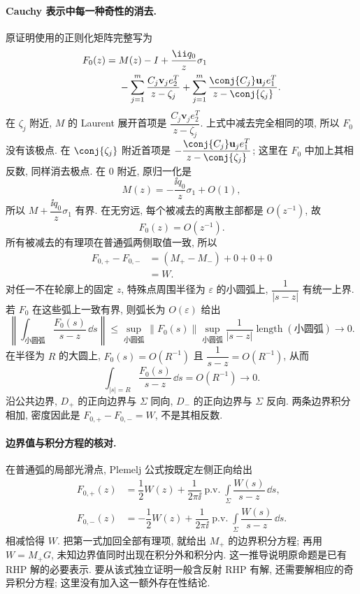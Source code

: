 \paragraph{Cauchy 表示中每一种奇性的消去.}
原证明使用的正则化矩阵完整写为
\[
\begin{aligned}
F_0(z)
={}&M(z)-I+\dfrac{\ii q_0}{z}\sigma_1\\
&-\sum\limits_{j=1}^{m}
\dfrac{C_j\mathbf v_je_2^T}{z-\zeta_j}
+\sum\limits_{j=1}^{m}
\dfrac{\conj{C_j}\mathbf u_je_1^T}{z-\conj{\zeta_j}}.
\end{aligned}
\]
在 $\zeta_j$ 附近, $M$ 的 Laurent 展开首项是
$\dfrac{C_j\mathbf v_je_2^T}{z-\zeta_j}$.
上式中减去完全相同的项, 所以 $F_0$ 没有该极点.
在 $\conj{\zeta_j}$ 附近首项是
$-\dfrac{\conj{C_j}\mathbf u_je_1^T}{z-\conj{\zeta_j}}$;
这里在 $F_0$ 中加上其相反数, 同样消去极点.
在 $0$ 附近, 原归一化是
\[
M(z)=-\dfrac{\ii q_0}{z}\sigma_1+O(1),
\]
所以 $M+\dfrac{\ii q_0}{z}\sigma_1$ 有界.
在无穷远, 每个被减去的离散主部都是 $O(z^{-1})$, 故
\[
F_0(z)=O(z^{-1}).
\]
所有被减去的有理项在普通弧两侧取值一致, 所以
\[
\begin{aligned}
F_{0,+}-F_{0,-}
&=(M_+-M_-)+0+0+0\\
&=W.
\end{aligned}
\]
对任一不在轮廓上的固定 $z$, 特殊点周围半径为 $\varepsilon$ 的小圆弧上,
$\dfrac{1}{|s-z|}$ 有统一上界.
若 $F_0$ 在这些弧上一致有界, 则弧长为 $O(\varepsilon)$ 给出
\[
\left\|
\int_{\text{小圆弧}}
\dfrac{F_0(s)}{s-z}\,\dd s
\right\|
\le
\sup\limits_{\text{小圆弧}}\|F_0(s)\|
\sup\limits_{\text{小圆弧}}\dfrac{1}{|s-z|}
\operatorname{length}(\text{小圆弧})
\longrightarrow0.
\]
在半径为 $R$ 的大圆上, $F_0(s)=O(R^{-1})$ 且
$\dfrac{1}{s-z}=O(R^{-1})$, 从而
\[
\int_{|s|=R}\dfrac{F_0(s)}{s-z}\,\dd s=O(R^{-1})\longrightarrow0.
\]
沿公共边界, $D_+$ 的正向边界与 $\Sigma$ 同向,
$D_-$ 的正向边界与 $\Sigma$ 反向.
两条边界积分相加, 密度因此是 $F_{0,+}-F_{0,-}=W$, 不是其相反数.

\paragraph{边界值与积分方程的核对.}
在普通弧的局部光滑点, Plemelj 公式按既定左侧正向给出
\[
\begin{aligned}
F_{0,+}(z)
&=\dfrac{1}{2}W(z)
+\dfrac{1}{2\pi\ii}\operatorname{p.v.}
\int\limits_\Sigma\dfrac{W(s)}{s-z}\,\dd s,\\
F_{0,-}(z)
&=-\dfrac{1}{2}W(z)
+\dfrac{1}{2\pi\ii}\operatorname{p.v.}
\int\limits_\Sigma\dfrac{W(s)}{s-z}\,\dd s.
\end{aligned}
\]
相减恰得 $W$.
把第一式加回全部有理项, 就给出 $M_+$ 的边界积分方程;
再用 $W=M_+G$, 未知边界值同时出现在积分外和积分内.
这一推导说明原命题是已有 RHP 解的必要表示.
要从该式独立证明一般含反射 RHP 有解, 还需要解相应的奇异积分方程;
这里没有加入这一额外存在性结论.

